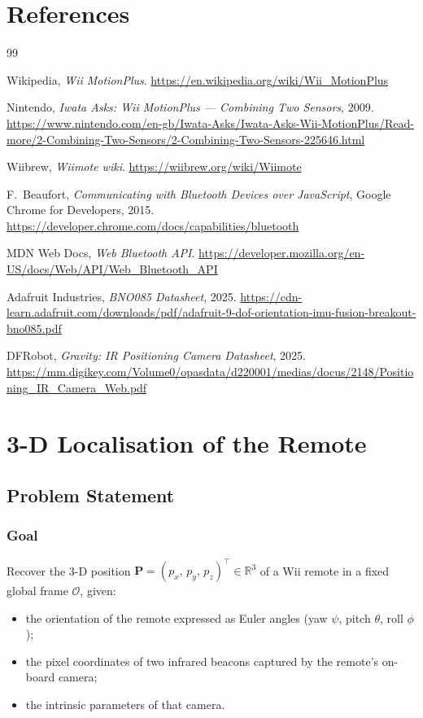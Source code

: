 \documentclass[12pt, a4paper]{article}
\begin{document}
\section{References}
\begin{thebibliography}{99}

Wikipedia, \textit{Wii MotionPlus}.
\url{https://en.wikipedia.org/wiki/Wii_MotionPlus}

Nintendo, \textit{Iwata Asks: Wii MotionPlus --- Combining Two Sensors}, 2009.
\url{https://www.nintendo.com/en-gb/Iwata-Asks/Iwata-Asks-Wii-MotionPlus/Read-more/2-Combining-Two-Sensors/2-Combining-Two-Sensors-225646.html}

Wiibrew, \textit{Wiimote wiki}.
\url{https://wiibrew.org/wiki/Wiimote}

F.\ Beaufort, \textit{Communicating with Bluetooth Devices over JavaScript},
Google Chrome for Developers, 2015.
\url{https://developer.chrome.com/docs/capabilities/bluetooth}

MDN Web Docs, \textit{Web Bluetooth API}.
\url{https://developer.mozilla.org/en-US/docs/Web/API/Web_Bluetooth_API}

Adafruit Industries, \textit{BNO085 Datasheet}, 2025.
\url{https://cdn-learn.adafruit.com/downloads/pdf/adafruit-9-dof-orientation-imu-fusion-breakout-bno085.pdf}

DFRobot, \textit{Gravity: IR Positioning Camera Datasheet}, 2025.
\url{https://mm.digikey.com/Volume0/opasdata/d220001/medias/docus/2148/Positioning_IR_Camera_Web.pdf}

\end{thebibliography}

\newpage
\appendix

\section{3-D Localisation of the Remote}
\label{annex:localisation}

\subsection{Problem Statement}

\subsubsection{Goal}
Recover the 3-D position $\mathbf{P} = (p_x,\, p_y,\, p_z)^\top \in \mathbb{R}^3$ of a Wii remote
in a fixed global frame $\mathcal{O}$, given:
\begin{itemize}[nosep]
    \item the orientation of the remote expressed as Euler angles
          (yaw $\psi$, pitch $\theta$, roll $\phi$);
    \item the pixel coordinates of two infrared beacons captured by the
          remote's on-board camera;
    \item the intrinsic parameters of that camera.
\end{itemize}
\end{document}
